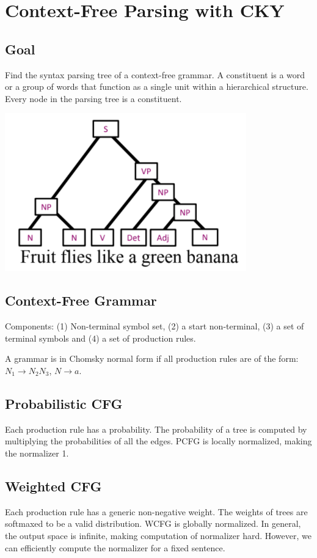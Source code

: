 \section{Context-Free Parsing with CKY}

\subsection*{Goal}

Find the syntax parsing tree of a context-free grammar. A constituent is a word or a group of words that function as a single unit within a hierarchical structure. Every node in the parsing tree is a constituent.
\begin{center}
    \includegraphics[width=.5\columnwidth]{img/syntex-tree.png}
\end{center}

\subsection*{Context-Free Grammar}

Components: (1) Non-terminal symbol set, (2) a start non-terminal, (3) a set of terminal symbols and (4) a set of production rules.

A grammar is in Chomsky normal form if all production rules are of the form: $N_1\rightarrow N_2 N_3$, $N\rightarrow a$.

\subsection*{Probabilistic CFG}

Each production rule has a probability. The probability of a tree is computed by multiplying the probabilities of all the edges. PCFG is locally normalized, making the normalizer 1.

\subsection*{Weighted CFG}

Each production rule has a generic non-negative weight. The weights of trees are softmaxed to be a valid distribution. WCFG is globally normalized. In general, the output space is infinite, making computation of normalizer hard. However, we can efficiently compute the normalizer for a fixed sentence.

